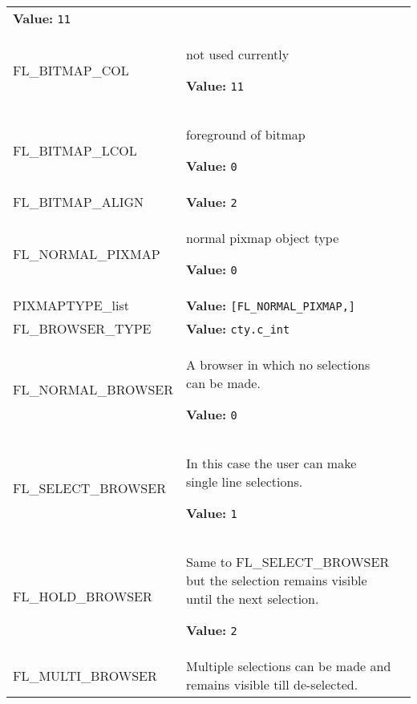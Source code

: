 \begin{longtable}{|p{\varnamewidth}|p{\vardescrwidth}|l}
\textbf{Value:} 
{\tt 11}&\\
\cline{1-2}
\raggedright F\-L\-\_\-B\-I\-T\-M\-A\-P\-\_\-C\-O\-L\-2\- & \raggedright not used currently

\textbf{Value:} 
{\tt 11}&\\
\cline{1-2}
\raggedright F\-L\-\_\-B\-I\-T\-M\-A\-P\-\_\-L\-C\-O\-L\- & \raggedright foreground of bitmap

\textbf{Value:} 
{\tt 0}&\\
\cline{1-2}
\raggedright F\-L\-\_\-B\-I\-T\-M\-A\-P\-\_\-A\-L\-I\-G\-N\- & \raggedright \textbf{Value:} 
{\tt 2}&\\
\cline{1-2}
\raggedright F\-L\-\_\-N\-O\-R\-M\-A\-L\-\_\-P\-I\-X\-M\-A\-P\- & \raggedright normal pixmap object type

\textbf{Value:} 
{\tt 0}&\\
\cline{1-2}
\raggedright P\-I\-X\-M\-A\-P\-T\-Y\-P\-E\-\_\-l\-i\-s\-t\- & \raggedright \textbf{Value:} 
{\tt [FL\_NORMAL\_PIXMAP,]}&\\
\cline{1-2}
\raggedright F\-L\-\_\-B\-R\-O\-W\-S\-E\-R\-\_\-T\-Y\-P\-E\- & \raggedright \textbf{Value:} 
{\tt cty.c\_int}&\\
\cline{1-2}
\raggedright F\-L\-\_\-N\-O\-R\-M\-A\-L\-\_\-B\-R\-O\-W\-S\-E\-R\- & \raggedright A browser in which no selections can be made.

\textbf{Value:} 
{\tt 0}&\\
\cline{1-2}
\raggedright F\-L\-\_\-S\-E\-L\-E\-C\-T\-\_\-B\-R\-O\-W\-S\-E\-R\- & \raggedright In this case the user can make single line selections.

\textbf{Value:} 
{\tt 1}&\\
\cline{1-2}
\raggedright F\-L\-\_\-H\-O\-L\-D\-\_\-B\-R\-O\-W\-S\-E\-R\- & \raggedright Same to FL\_SELECT\_BROWSER but the selection remains visible until
the next selection.

\textbf{Value:} 
{\tt 2}&\\
\cline{1-2}
\raggedright F\-L\-\_\-M\-U\-L\-T\-I\-\_\-B\-R\-O\-W\-S\-E\-R\- & \raggedright Multiple selections can be made and remains visible till de-selected.


\end{longtable}
